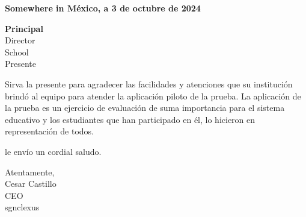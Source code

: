 \documentclass[letterpaper]{letter}
\begin{document}
\large

\vspace*{.5cm}  %

\begin{flushright}    
    \textbf{Somewhere in México, a 3 de octubre de 2024}   
\end{flushright} 
\vspace{3\baselineskip}
\textbf{{{Principal}} } \\
Director \\ 
{{School}} \\
Presente 

Sirva la presente para agradecer las facilidades y atenciones que su institución brindó al equipo para atender la aplicación piloto de la prueba. La aplicación de la prueba es un ejercicio de evaluación de suma importancia para el sistema educativo y los estudiantes que han participado en él, lo hicieron en representación de todos.


le envío un cordial saludo. 

\vspace{1\baselineskip}
\begin{center}
    Atentamente, \\    
    \vspace{1\baselineskip}
    \vspace{1\baselineskip}
    Cesar Castillo \\ 
    CEO \\ 
    sgnclexus \\    
\end{center}
\end{document}
